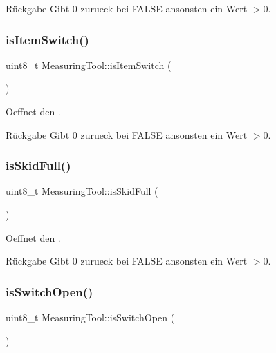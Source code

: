 \begin{DoxyReturn}{Rückgabe}
Gibt 0 zurueck bei F\+A\+L\+SE ansonsten ein Wert $>$0. 
\end{DoxyReturn}
\hypertarget{class_measuring_tool_a25d27399efb7e1a0daceeb270e9c26cc}{}\label{class_measuring_tool_a25d27399efb7e1a0daceeb270e9c26cc} 
\subsubsection{\texorpdfstring{is\+Item\+Switch()}{isItemSwitch()}}
{\footnotesize\ttfamily uint8\+\_\+t Measuring\+Tool\+::is\+Item\+Switch (\begin{DoxyParamCaption}{ }\end{DoxyParamCaption})}

Oeffnet den .

\begin{DoxyReturn}{Rückgabe}
Gibt 0 zurueck bei F\+A\+L\+SE ansonsten ein Wert $>$0. 
\end{DoxyReturn}
\hypertarget{class_measuring_tool_a33ece6093e5b77f9353f86d2d9be64f6}{}\label{class_measuring_tool_a33ece6093e5b77f9353f86d2d9be64f6} 
\subsubsection{\texorpdfstring{is\+Skid\+Full()}{isSkidFull()}}
{\footnotesize\ttfamily uint8\+\_\+t Measuring\+Tool\+::is\+Skid\+Full (\begin{DoxyParamCaption}{ }\end{DoxyParamCaption})}

Oeffnet den .

\begin{DoxyReturn}{Rückgabe}
Gibt 0 zurueck bei F\+A\+L\+SE ansonsten ein Wert $>$0. 
\end{DoxyReturn}
\hypertarget{class_measuring_tool_ad46b12c36f63fa9b597b1df6468d6aac}{}\label{class_measuring_tool_ad46b12c36f63fa9b597b1df6468d6aac} 
\subsubsection{\texorpdfstring{is\+Switch\+Open()}{isSwitchOpen()}}
{\footnotesize\ttfamily uint8\+\_\+t Measuring\+Tool\+::is\+Switch\+Open (\begin{DoxyParamCaption}{ }\end{DoxyParamCaption})}

